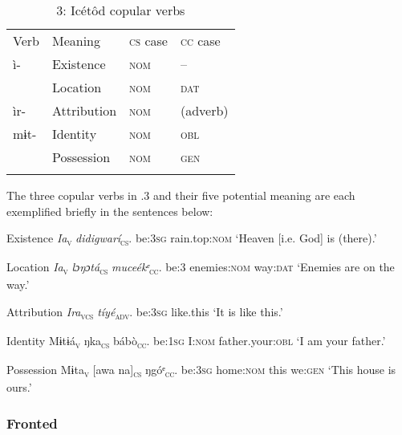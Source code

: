 \begin{table}
\begin{table}
\caption{3: Icétôd copular verbs}
\label{tab:10}


\begin{tabularx}{\textwidth}{XXXX}
\lsptoprule

Verb & Meaning & \textsc{cs} case & \textsc{cc} case\\
ì- & Existence & \textsc{nom} & \textsc{–}\\
& Location & \textsc{nom} & \textsc{dat}\\
ìr- & Attribution & \textsc{nom} & (adverb)\\
mɨt- & Identity & \textsc{nom} & \textsc{obl}\\
& Possession & \textsc{nom} & \textsc{gen}\\
\lspbottomrule
\end{tabularx}
\end{table}
The three copular verbs in .3 and their five potential meaning are each exemplified briefly in the sentences below:




Existence
\textit{Ia}\textsc{\textsubscript{v}}\textit{     didigwarí}\textsc{\textsubscript{cs}}.
be:\textsc{3sg}   rain.top:\textsc{nom}
‘Heaven [i.e. God] is (there).’




Location
\textit{Ia}\textsc{\textsubscript{v}}\textit{   lɔŋɔtá}\textsc{\textsubscript{cs}}\textit{     muceékᵉ}\textsc{\textsubscript{cc}}.
be:3   enemies:\textsc{nom}   way:\textsc{dat}
‘Enemies are on the way.’




Attribution
\textit{Ira}\textsc{\textsubscript{vcs}}\textit{     tíyé}\textsc{\textsubscript{adv}}.
be:\textsc{3sg}   like.this
‘It is like this.’




Identity
Mɨtɨá\textsc{\textsubscript{v}}   ŋka\textsc{\textsubscript{cs}}    bábò\textsc{\textsubscript{cc}}.
be:\textsc{1sg}   I:\textsc{nom    }father.your:\textsc{obl}
‘I am your father.’




Possession
Mɨta\textsc{\textsubscript{v}}     [awa     na]\textsc{\textsubscript{cs}}   ŋgóᵉ\textsc{\textsubscript{cc}}.
be:\textsc{3sg}   home:\textsc{nom}   this   we:\textsc{gen}
‘This house is ours.’




\subsubsection{Fronted}


\end{table}
